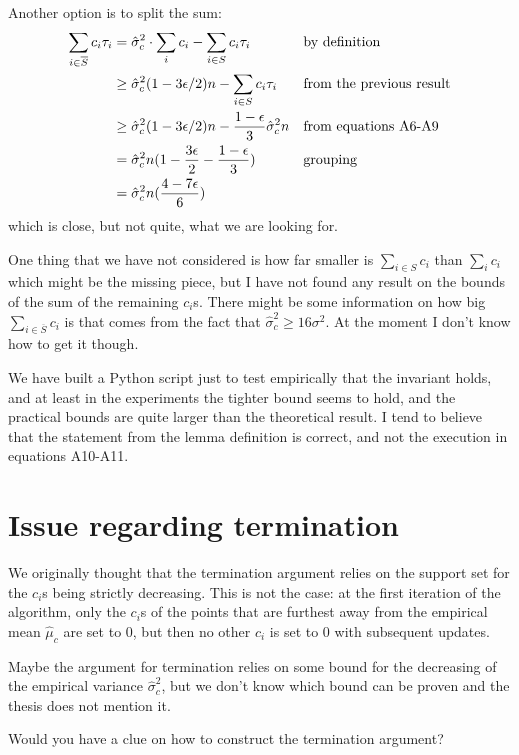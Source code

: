 \documentclass[11pt]{article}
\begin{document}
Another option is to split the sum:
\begin{align*}
\sum_{i \in \overline S} c_i \tau_i &= \hat\sigma_c^2 \cdot \sum_i c_i - \sum_{i \in S} c_i \tau_i &&\text{by definition}\\
&\ge \hat\sigma_c^2(1-3\epsilon/2)n - \sum_{i\in S}c_i \tau_i&&\text{from the previous result}\\
&\ge \hat\sigma_c^2(1-3\epsilon/2)n - {1-\epsilon \over 3}\hat\sigma_c^2n &&\text{from equations A6-A9}\\
&= \hat\sigma_c^2n(1-{3\epsilon\over 2} - {1-\epsilon \over 3}) &&\text{grouping}\\
&= \hat\sigma_c^2n({4-7\epsilon \over 6})
\end{align*}
which is close, but not quite, what we are looking for.

One thing that we have not considered is how far smaller is \(\sum_{i\in S} c_i\) than \(\sum_i c_i\) which might be the missing piece, but I have not found any result on the bounds of the sum of the remaining \(c_i\)s.
There might be some information on how big \(\sum_{i \in \overline S} c_i\) is that comes from the fact that \(\hat\sigma_c^2 \ge 16 \sigma^2\).
At the moment I don't know how to get it though.

We have built a Python script just to test empirically that the invariant holds, and at least in the experiments the tighter bound seems to hold, and the practical bounds are quite larger than the theoretical result. I tend to believe that the statement from the lemma definition is correct, and not the execution in equations A10-A11.

\section{Issue regarding termination}
We originally thought that the termination argument relies on the support set for the $c_i$s being strictly decreasing.
This is not the case: at the first iteration of the algorithm, only the $c_i$s of the points that are furthest away from the empirical mean $\hat\mu_c$ are set to 0, but then no other $c_i$ is set to 0 with subsequent updates.

Maybe the argument for termination relies on some bound for the decreasing of the empirical variance $\hat\sigma_c^2$, but we don't know which bound can be proven and the thesis does not mention it.

Would you have a clue on how to construct the termination argument?
\end{document}
